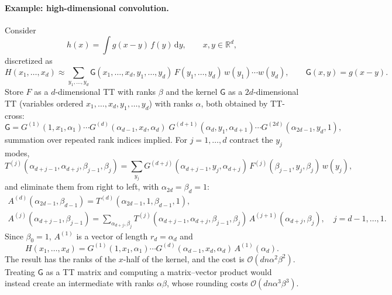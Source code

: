\documentclass[11pt,a4paper]{article}
\numberwithin{equation}{section}
\theoremstyle{remark}
\newcommand{\dd}{\mathrm{d}}
\newcommand{\R}{\mathbb{R}}
\begin{document}
\paragraph{Example: high-dimensional convolution.}
Consider
\begin{equation}
h(x)=\int g(x-y)\,f(y)\,\dd y,\qquad x,y\in\R^d,
\end{equation}
discretized as
\begin{equation}
H(x_1,\dots,x_d)\approx\sum_{y_1,\dots,y_d}\mathsf{G}(x_1,\dots,x_d,y_1,\dots,y_d)\,F(y_1,\dots,y_d)\,w(y_1)\cdots w(y_d),
\qquad \mathsf{G}(x,y)=g(x-y).
\end{equation}
Store $F$ as a $d$-dimensional TT with ranks $\beta$ and the kernel $\mathsf{G}$ as a $2d$-dimensional TT (variables ordered $x_1,\dots,x_d,y_1,\dots,y_d$) with ranks $\alpha$, both obtained by TT-cross:
\begin{equation}
\mathsf{G}=G^{(1)}(1,x_1,\alpha_1)\cdots G^{(d)}(\alpha_{d-1},x_d,\alpha_d)\;G^{(d+1)}(\alpha_d,y_1,\alpha_{d+1})\cdots G^{(2d)}(\alpha_{2d-1},y_d,1),
\end{equation}
summation over repeated rank indices implied. For $j=1,\dots,d$ contract the $y_j$ modes,
\begin{equation}
T^{(j)}(\alpha_{d+j-1},\alpha_{d+j},\beta_{j-1},\beta_j)=\sum_{y_j}G^{(d+j)}(\alpha_{d+j-1},y_j,\alpha_{d+j})\,F^{(j)}(\beta_{j-1},y_j,\beta_j)\,w(y_j),
\end{equation}
and eliminate them from right to left, with $\alpha_{2d}=\beta_d=1$:
\begin{gather}
A^{(d)}(\alpha_{2d-1},\beta_{d-1})=T^{(d)}(\alpha_{2d-1},1,\beta_{d-1},1),\\
A^{(j)}(\alpha_{d+j-1},\beta_{j-1})=\sum_{\alpha_{d+j},\beta_j}T^{(j)}(\alpha_{d+j-1},\alpha_{d+j},\beta_{j-1},\beta_j)\,A^{(j+1)}(\alpha_{d+j},\beta_j),\quad j=d-1,\dots,1.
\end{gather}
Since $\beta_0=1$, $A^{(1)}$ is a vector of length $r_d=\alpha_d$ and
\begin{equation}
H(x_1,\dots,x_d)=G^{(1)}(1,x_1,\alpha_1)\cdots G^{(d)}(\alpha_{d-1},x_d,\alpha_d)\,A^{(1)}(\alpha_d).
\end{equation}
The result has the ranks of the $x$-half of the kernel, and the cost is $\mathcal{O}(dn\alpha^2\beta^2)$.
Treating $\mathsf{G}$ as a TT matrix and computing a matrix--vector product would instead create an intermediate with ranks $\alpha\beta$, whose rounding costs $\mathcal{O}(dn\alpha^3\beta^3)$.

\end{document}
